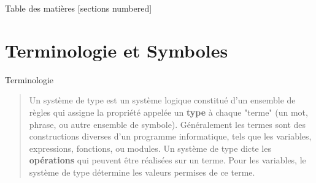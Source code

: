 \documentclass[10pt]{beamer}
\begin{document}
\begin{frame}{Table des matières}
  [sections numbered]
  \tableofcontents%
\end{frame}


\section{Terminologie et Symboles}

\begin{frame}{Terminologie}
  \begin{quote}
    Un \alert{système de type} est un système logique constitué d'un ensemble de règles qui assigne la propriété appelée un \textbf{type} à chaque "terme" (un mot, phrase, ou autre ensemble de symbole). Généralement les termes sont des constructions diverses d'un programme informatique, tels que les variables, expressions, fonctions, ou modules.
    Un système de type dicte les \textbf{opérations} qui peuvent être réalisées sur un terme. Pour les variables, le système de type détermine les valeurs permises de ce terme.
    \cite{noauthor_type_2022}
  \end{quote}
\end{frame}
\end{document}
